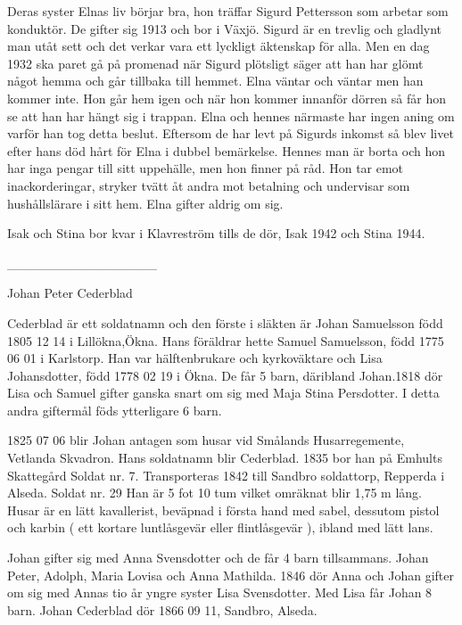 Deras syster Elnas liv börjar bra, hon träffar Sigurd Pettersson som arbetar som konduktör. De gifter sig 1913 och bor i Växjö. Sigurd är en trevlig och gladlynt man utåt sett och det verkar vara ett lyckligt äktenskap för alla. Men en dag 1932 ska paret gå på promenad när Sigurd plötsligt säger att han har glömt något hemma och går tillbaka till hemmet. Elna väntar och väntar men han kommer inte. Hon går hem igen och när hon kommer innanför dörren så får hon se att han har hängt sig i trappan. Elna och hennes närmaste har ingen aning om varför han tog detta beslut.
Eftersom de har levt på Sigurds inkomst så blev livet efter hans död hårt för Elna i dubbel bemärkelse. Hennes man är borta och hon har inga pengar till sitt uppehälle, men hon finner på råd. Hon tar emot inackorderingar, stryker tvätt åt andra mot betalning och undervisar  som hushållslärare i sitt hem. Elna gifter aldrig om sig.


Isak och Stina bor kvar i Klavreström tills de dör, Isak 1942 och Stina 1944.








________________


Johan Peter Cederblad


Cederblad är ett soldatnamn och den förste i släkten är Johan Samuelsson född 1805 12 14 i Lillökna,Ökna.  Hans föräldrar hette Samuel Samuelsson, född 1775 06 01 i Karlstorp. Han var hälftenbrukare och kyrkoväktare och Lisa Johansdotter, född 1778 02 19 i Ökna. De får 5 barn, däribland Johan.1818 dör Lisa och Samuel gifter ganska snart om sig med Maja Stina Persdotter. I detta andra giftermål föds ytterligare 6 barn.


1825 07 06 blir Johan antagen som husar vid Smålands Husarregemente, Vetlanda Skvadron. Hans soldatnamn blir Cederblad. 1835 bor han på Emhults Skattegård Soldat nr. 7. Transporteras 1842 till Sandbro soldattorp, Repperda i Alseda. Soldat nr. 29 
Han är 5 fot 10 tum vilket omräknat blir 1,75 m lång.
Husar är en lätt kavallerist, beväpnad i första hand med sabel, dessutom pistol och karbin ( ett kortare luntlåsgevär eller flintlåsgevär ), ibland med lätt lans.


Johan gifter sig med Anna Svensdotter och de får 4 barn tillsammans. Johan Peter, Adolph, Maria Lovisa och Anna Mathilda. 1846 dör Anna och Johan gifter om sig med Annas tio år yngre syster Lisa Svensdotter. Med Lisa får Johan 8 barn.
Johan Cederblad dör 1866 09 11, Sandbro, Alseda.


